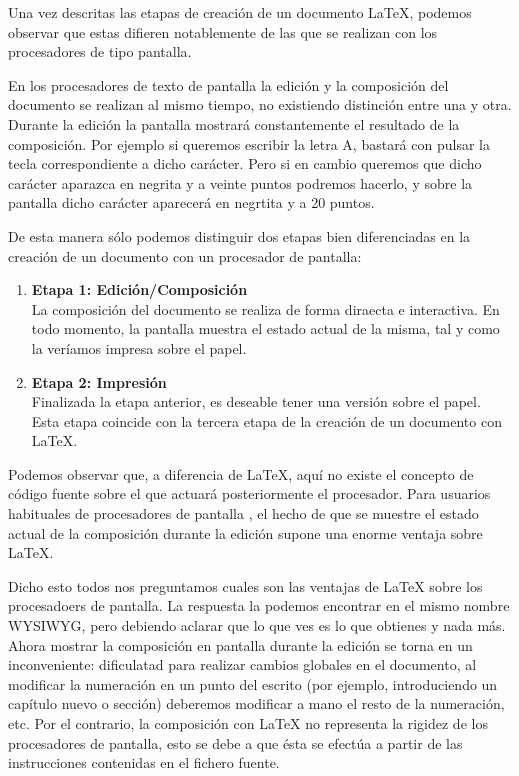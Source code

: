 Una vez descritas las etapas de creaci\'on de un documento \LaTeX{}, podemos observar que estas difieren notablemente
de las que se realizan con los procesadores de tipo pantalla.

En los procesadores de texto de pantalla la edici\'on y la composici\'on del documento se realizan al mismo tiempo, no
existiendo distinci\'on entre una y otra. Durante la  edici\'on la pantalla mostrar\'a constantemente el resultado de 
la composici\'on. Por ejemplo si queremos escribir la letra A, bastar\'a con pulsar la tecla correspondiente a dicho
car\'acter. Pero si en cambio queremos que dicho car\'acter aparazca en negrita y a veinte puntos podremos hacerlo, y 
sobre la pantalla dicho car\'acter aparecer\'a en negrtita y a 20 puntos.

De esta manera s\'olo podemos distinguir dos etapas bien diferenciadas en la creaci\'on de un documento con un procesador
de pantalla:

\begin{enumerate}
	\item \textbf{Etapa 1: Edici\'on/Composici\'on}\\
				La composici\'on del documento se realiza de forma diraecta e interactiva. En todo momento, la pantalla muestra 
				el estado actual de la misma, tal y como la ver\'iamos impresa sobre el papel.   
				
	
	\item \textbf{Etapa 2: Impresi\'on}\\
				Finalizada la etapa anterior, es deseable tener una versi\'on sobre el papel. Esta etapa coincide con la tercera 
				etapa de la creaci\'on de un documento con \LaTeX{}.
\end{enumerate}
   
Podemos observar que, a diferencia de \LaTeX{}, aqu\'i no existe el concepto de c\'odigo fuente sobre el que actuar\'a
posteriormente el procesador. Para usuarios habituales de procesadores de pantalla , el hecho de que se muestre el estado actual de la composici\'on durante la edici\'on supone una enorme ventaja sobre \LaTeX{}.

Dicho esto todos nos preguntamos cuales son las ventajas de \LaTeX{} sobre los procesadoers de pantalla. La respuesta 
la podemos encontrar en el mismo nombre WYSIWYG, pero debiendo aclarar que lo que ves es lo que obtienes y nada m\'as.
Ahora mostrar la composici\'on en pantalla durante la edici\'on se torna en un inconveniente: dificulatad para realizar 
cambios globales en el documento, al modificar la numeraci\'on en un punto del escrito (por ejemplo, introduciendo un
cap\'itulo nuevo o secci\'on) deberemos modificar a mano el resto de la numeraci\'on, etc. Por el contrario, la 
composici\'on con \LaTeX{} no representa la rigidez de los procesadores de pantalla, esto se debe a que \'esta se 
efect\'ua a partir de las instrucciones contenidas en el fichero fuente.

